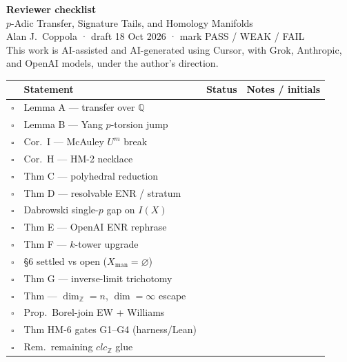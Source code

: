 \documentclass[11pt]{article}
\begin{document}
\begin{center}
{\LARGE\bfseries Reviewer checklist}\\[0.3em]
{\large $p$-Adic Transfer, Signature Tails, and Homology Manifolds}\\[0.2em]
{\small Alan J.\ Coppola · draft 18 Oct 2026 · mark PASS / WEAK / FAIL}\\[0.25em]
{\footnotesize This work is AI-assisted and AI-generated using Cursor, with Grok, Anthropic, and OpenAI models, under the author's direction.}
\end{center}
\vspace{0.6em}
\begin{tabular}{@{}clp{3.0cm}p{4.6cm}@{}}
\toprule
 & Statement & Status & Notes / initials \\
\midrule
$\square$ & Lemma A — transfer over $\mathbb{Q}$ & \underline{\hspace{2.2cm}} & \\
$\square$ & Lemma B — Yang $p$-torsion jump & \underline{\hspace{2.2cm}} & \\
$\square$ & Cor.\ I — McAuley $U^m$ break & \underline{\hspace{2.2cm}} & \\
$\square$ & Cor.\ H — HM-2 necklace & \underline{\hspace{2.2cm}} & \\
$\square$ & Thm C — polyhedral reduction & \underline{\hspace{2.2cm}} & \\
$\square$ & Thm D — resolvable ENR / stratum & \underline{\hspace{2.2cm}} & \\
$\square$ & Dabrowski single-$p$ gap on $I(X)$ & \underline{\hspace{2.2cm}} & \\
$\square$ & Thm E — OpenAI ENR rephrase & \underline{\hspace{2.2cm}} & \\
$\square$ & Thm F — $k$-tower upgrade & \underline{\hspace{2.2cm}} & \\
$\square$ & \S6 settled vs open ($X_{\mathrm{man}}=\varnothing$) & \underline{\hspace{2.2cm}} & \\
$\square$ & Thm G — inverse-limit trichotomy & \underline{\hspace{2.2cm}} & \\
$\square$ & Thm — $\dim_{\mathbb{Z}}=n$, $\dim=\infty$ escape & \underline{\hspace{2.2cm}} & \\
$\square$ & Prop.\ Borel-join EW + Williams & \underline{\hspace{2.2cm}} & \\
$\square$ & Thm HM-6 gates G1--G4 (harness/Lean) & \underline{\hspace{2.2cm}} & \\
$\square$ & Rem.\ remaining $clc_{\mathbb{Z}}$ glue & \underline{\hspace{2.2cm}} & \\
\bottomrule
\end{tabular}
\end{document}
